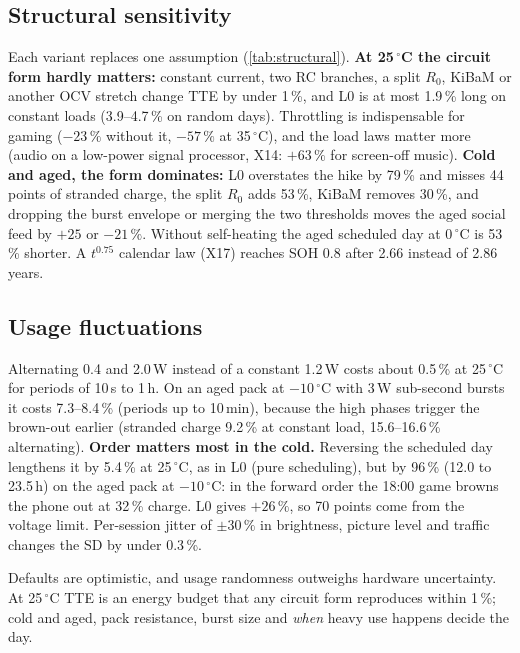 \subsection{Structural sensitivity}\label{sec:structural}
\begin{table}[t]\centering\footnotesize
\caption{Structural variants: change of TTE (\%) and of stranded charge (points) against L2. S4 social, S7 gaming,
S12 scheduled day, S13 typical random day, S9 cold hike, S10a social. Not shown: X11 brightness law, X12
energy-fraction display, X13 processor leakage, X14 audio on a low-power signal processor (S16 $+63\,\%$), X17
$t^{0.75}$ calendar law, X18 other OCV stretches.}
\label{tab:structural}

\end{table}
Each variant replaces one assumption (\cref{tab:structural}). \textbf{At 25\,$^\circ$C the circuit form hardly
matters:} constant current, two RC branches, a split $R_0$, KiBaM or another OCV stretch change TTE by
under 1\,\%, and L0 is at most 1.9\,\% long on constant loads (3.9--4.7\,\% on random days). Throttling is indispensable for gaming ($-23\,\%$ without
it, $-57\,\%$ at 35\,$^\circ$C), and the load laws matter more (audio on a low-power signal processor, X14:
$+63\,\%$ for screen-off music).
\textbf{Cold and aged, the form dominates:} L0 overstates the hike by 79\,\% and misses 44 points of stranded charge,
the split $R_0$ adds 53\,\%, KiBaM removes 30\,\%, and dropping the burst envelope or merging the two thresholds
moves the aged social feed by $+25$ or $-21\,\%$. Without self-heating the aged scheduled day at 0\,$^\circ$C is
53\,\% shorter. A $t^{0.75}$ calendar law (X17) reaches SOH 0.8 after 2.66 instead of 2.86 years.

\subsection{Usage fluctuations}
Alternating 0.4 and 2.0\,W instead of a constant 1.2\,W costs about 0.5\,\% at 25\,$^\circ$C for periods of 10\,s to
1\,h. On an aged pack at $-10\,^\circ$C with 3\,W sub-second bursts it costs 7.3--8.4\,\% (periods up to 10\,min),
because the high phases trigger the brown-out earlier (stranded charge 9.2\,\% at constant load, 15.6--16.6\,\%
alternating). \textbf{Order matters most
in the cold.} Reversing the scheduled day lengthens it by 5.4\,\% at 25\,$^\circ$C, as in L0 (pure scheduling), but
by 96\,\% (12.0 to 23.5\,h) on the aged pack at $-10\,^\circ$C: in the forward order the 18:00 game browns the phone
out at 32\,\% charge. L0 gives $+26\,\%$, so 70 points come from the voltage limit. Per-session jitter of $\pm30\,\%$
in brightness, picture level and traffic changes the SD by under 0.3\,\%.

\begin{keybox}
Defaults are optimistic, and usage randomness outweighs hardware uncertainty. At 25\,$^\circ$C TTE is an energy
budget that any circuit form reproduces within 1\,\%; cold and aged, pack resistance, burst size and \emph{when}
heavy use happens decide the day.
\end{keybox}
